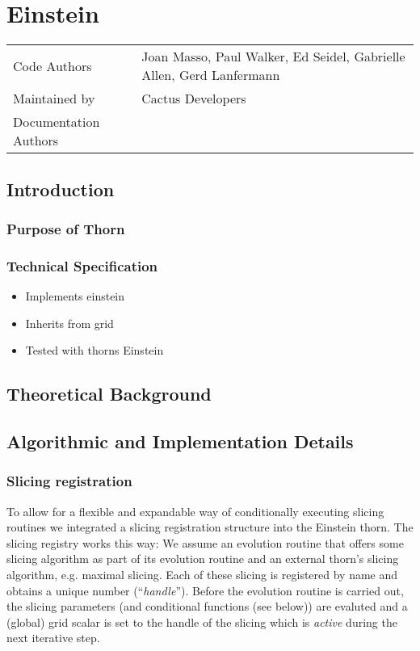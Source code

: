 \newcommand{\parameter}[1]{{\it #1}}



\chapter{Einstein}

\begin{tabular}{@{}ll}
Code Authors & Joan Masso, Paul Walker, Ed Seidel, Gabrielle Allen,
Gerd Lanfermann \\
Maintained by & Cactus Developers \\
Documentation Authors & 
\end{tabular}

\section{Introduction}
  
\subsection{Purpose of Thorn}


\subsection{Technical Specification}

\begin{itemize}

\item{Implements} einstein
\item{Inherits from} grid
\item{Tested with thorns} Einstein

\end{itemize}

\section{Theoretical Background}


\section{Algorithmic and Implementation Details}


\subsection{Slicing registration}
To allow for a flexible and expandable way of conditionally executing slicing
routines we integrated a slicing registration structure into the Einstein
thorn. The slicing registry works this way:
We assume an evolution routine that offers some slicing algorithm as
part of its evolution routine and an external thorn's slicing algorithm, e.g.
maximal slicing. Each of these slicing is registered by name and
obtains a unique number (``{\em handle}''). Before the evolution routine is
carried out, the slicing parameters (and conditional functions (see
below)) are evaluted and a (global) grid scalar is set to the handle
of the slicing which is {\em active} during the next iterative step.

